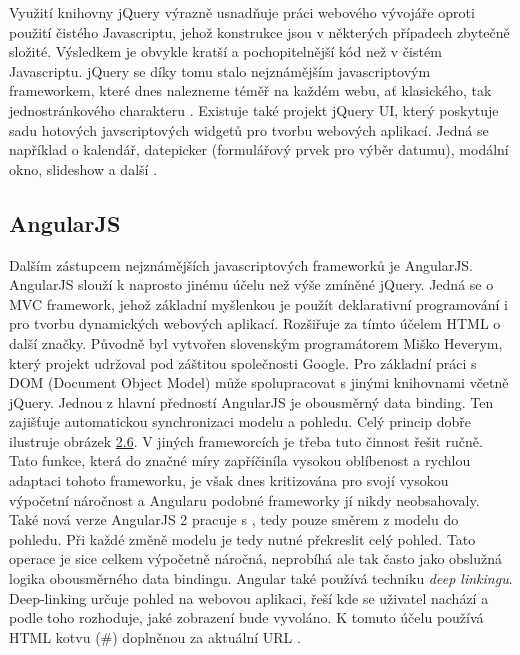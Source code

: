 \pagebreak
Využití knihovny jQuery výrazně usnadňuje práci webového vývojáře oproti použití čistého Javascriptu, jehož konstrukce jsou v některých případech zbytečně složité. Výsledkem je obvykle kratší a pochopitelnější kód než v čistém Javascriptu. jQuery se díky tomu stalo nejznámějším javascriptovým frameworkem, které dnes nalezneme téměř na každém webu, ať klasického, tak jednostránkového charakteru \cite{jquery_book}. 
Existuje také projekt jQuery UI, který poskytuje sadu hotových javscriptových widgetů pro tvorbu webových aplikací. Jedná se například o kalendář, datepicker (formulářový prvek pro výběr datumu), modální okno, slideshow a další \cite{jquery_ui}.
\subsection{AngularJS}
Dalším zástupcem nejznámějších javascriptových frameworků je AngularJS. AngularJS slouží k naprosto jinému účelu než výše zmíněné jQuery.
Jedná se o MVC framework, jehož základní myšlenkou je použít deklarativní programování i pro tvorbu dynamických webových aplikací. Rozšiřuje za tímto účelem HTML o další značky. Původně byl vytvořen slovenským programátorem Miško Heverym, který projekt udržoval pod záštitou společnosti Google. Pro základní práci s DOM (Document Object Model) může spolupracovat s jinými knihovnami včetně jQuery. Jednou z hlavní předností AngularJS je obousměrný data binding. Ten zajišťuje automatickou synchronizaci modelu a pohledu. Celý princip dobře ilustruje obrázek \hyperref[fig:twoway-angular]{2.6}. V jiných frameworcích je třeba tuto činnost řešit ručně. Tato funkce, která do značné míry zapříčiníla vysokou oblíbenost a rychlou adaptaci tohoto frameworku, je však dnes kritizována pro svojí vysokou výpočetní náročnost a Angularu podobné frameworky jí nikdy neobsahovaly. Také nová verze AngularJS 2 pracuje s , tedy pouze směrem z modelu do pohledu. Při každé změně modelu je tedy nutné překreslit celý pohled. Tato operace je sice celkem výpočetně náročná, neprobíhá ale tak často jako obslužná logika obousměrného data bindingu. Angular také používá techniku \textit{deep linkingu}. Deep-linking určuje pohled na webovou aplikaci, řeší kde se uživatel nachází a podle toho rozhoduje, jaké zobrazení bude vyvoláno. K tomuto účelu používá HTML kotvu (\#) doplněnou za aktuální URL \cite{angular} \cite{spa_horyna}.

